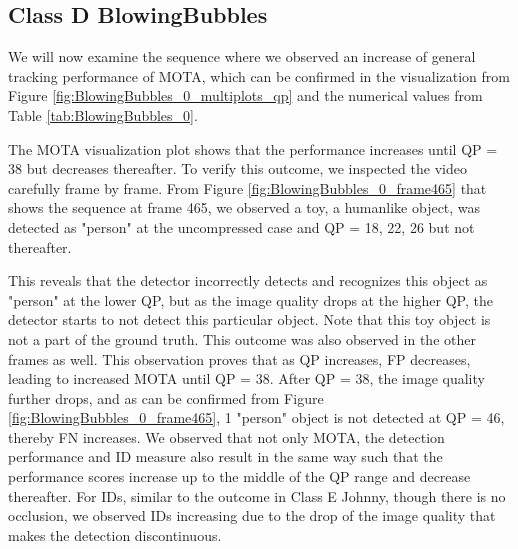 \subsection{Class D BlowingBubbles}
We will now examine the sequence where we observed an increase of general tracking performance of MOTA, which can be confirmed in the visualization from Figure \ref{fig:BlowingBubbles_0_multiplots_qp} and the numerical values from Table \ref{tab:BlowingBubbles_0}.


The MOTA visualization plot shows that the performance increases until QP = 38 but decreases thereafter. To verify this outcome, we inspected the video carefully frame by frame. From Figure \ref{fig:BlowingBubbles_0_frame465} that shows the sequence at frame 465, we observed a toy, a humanlike object, was detected as "person" at the uncompressed case and QP = 18, 22, 26 but not thereafter.

This reveals that the detector incorrectly detects and recognizes this object as "person" at the lower QP, but as the image quality drops at the higher QP, the detector starts to not detect this particular object. Note that this toy object is not a part of the ground truth. This outcome was also observed in the other frames as well. This observation proves that as QP increases, FP decreases, leading to increased MOTA until QP = 38. After QP = 38, the image quality further drops, and as can be confirmed from Figure \ref{fig:BlowingBubbles_0_frame465}, 1 "person" object is not detected at QP = 46, thereby FN increases. We observed that not only MOTA, the detection performance and ID measure also result in the same way such that the performance scores increase up to the middle of the QP range and decrease thereafter. For IDs, similar to the outcome in Class E Johnny, though there is no occlusion, we observed IDs increasing due to the drop of the image quality that makes the detection discontinuous.


